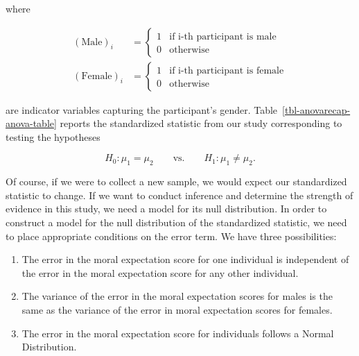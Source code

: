 \documentclass[
  letterpaper,
  DIV=11,
  numbers=noendperiod]{scrreprt}
\providecommand{\tightlist}{%
  \setlength{\itemsep}{0pt}\setlength{\parskip}{0pt}}\usepackage{longtable,booktabs,array}
\theoremstyle{definition}
\theoremstyle{definition}
\theoremstyle{plain}
\theoremstyle{remark}
\begin{document}
where

\[
\begin{aligned}
  (\text{Male})_i &= \begin{cases}
    1 & \text{if i-th participant is male} \\
    0 & \text{otherwise} 
    \end{cases} \\
  (\text{Female})_i &= \begin{cases}
    1 & \text{if i-th participant is female} \\
    0 & \text{otherwise}
    \end{cases}
\end{aligned}
\]

are indicator variables capturing the participant's gender.
Table~\ref{tbl-anovarecap-anova-table} reports the standardized
statistic from our study corresponding to testing the hypotheses

\[H_0: \mu_1 = \mu_2 \qquad \text{vs.} \qquad H_1: \mu_1 \neq \mu_2.\]

\begin{table}

\caption{\label{tbl-anovarecap-anova-table}ANOVA table summarizing the
comparison of the moral expectation score across gender within the
Organic Food Case Study.}


\end{table}%

Of course, if we were to collect a new sample, we would expect our
standardized statistic to change. If we want to conduct inference and
determine the strength of evidence in this study, we need a model for
its null distribution. In order to construct a model for the null
distribution of the standardized statistic, we need to place appropriate
conditions on the error term. We have three possibilities:

\begin{enumerate}
\def\labelenumi{\arabic{enumi}.}
\tightlist
\item
  The error in the moral expectation score for one individual is
  independent of the error in the moral expectation score for any other
  individual.
\item
  The variance of the error in the moral expectation scores for males is
  the same as the variance of the error in moral expectation scores for
  females.
\item
  The error in the moral expectation score for individuals follows a
  Normal Distribution.
\end{enumerate}
\end{document}
